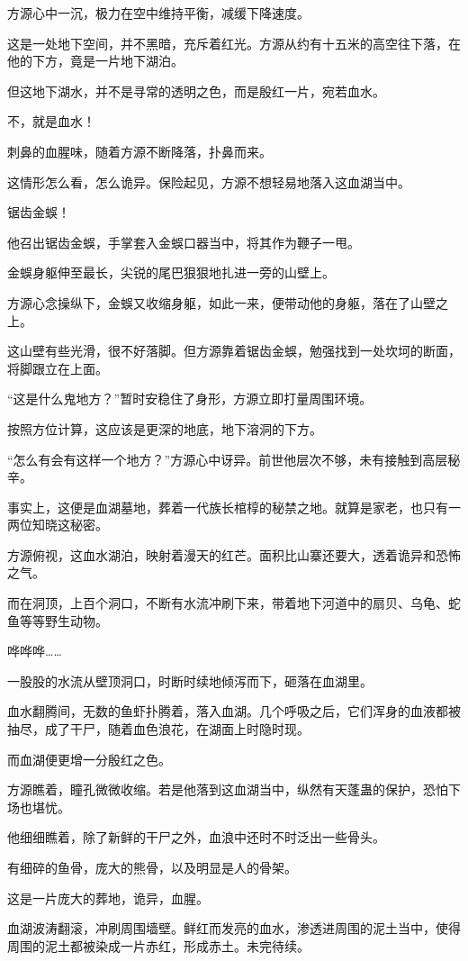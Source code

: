 \begin{this_body}
方源心中一沉，极力在空中维持平衡，减缓下降速度。

这是一处地下空间，并不黑暗，充斥着红光。方源从约有十五米的高空往下落，在他的下方，竟是一片地下湖泊。

但这地下湖水，并不是寻常的透明之色，而是殷红一片，宛若血水。

不，就是血水！

刺鼻的血腥味，随着方源不断降落，扑鼻而来。

这情形怎么看，怎么诡异。保险起见，方源不想轻易地落入这血湖当中。

锯齿金蜈！

他召出锯齿金蜈，手掌套入金蜈口器当中，将其作为鞭子一甩。

金蜈身躯伸至最长，尖锐的尾巴狠狠地扎进一旁的山壁上。

方源心念操纵下，金蜈又收缩身躯，如此一来，便带动他的身躯，落在了山壁之上。

这山壁有些光滑，很不好落脚。但方源靠着锯齿金蜈，勉强找到一处坎坷的断面，将脚跟立在上面。

“这是什么鬼地方？”暂时安稳住了身形，方源立即打量周围环境。

按照方位计算，这应该是更深的地底，地下溶洞的下方。

“怎么有会有这样一个地方？”方源心中讶异。前世他层次不够，未有接触到高层秘辛。

事实上，这便是血湖墓地，葬着一代族长棺椁的秘禁之地。就算是家老，也只有一两位知晓这秘密。

方源俯视，这血水湖泊，映射着漫天的红芒。面积比山寨还要大，透着诡异和恐怖之气。

而在洞顶，上百个洞口，不断有水流冲刷下来，带着地下河道中的扇贝、乌龟、蛇鱼等等野生动物。

哗哗哗……

一股股的水流从壁顶洞口，时断时续地倾泻而下，砸落在血湖里。

血水翻腾间，无数的鱼虾扑腾着，落入血湖。几个呼吸之后，它们浑身的血液都被抽尽，成了干尸，随着血色浪花，在湖面上时隐时现。

而血湖便更增一分殷红之色。

方源瞧着，瞳孔微微收缩。若是他落到这血湖当中，纵然有天蓬蛊的保护，恐怕下场也堪忧。

他细细瞧着，除了新鲜的干尸之外，血浪中还时不时泛出一些骨头。

有细碎的鱼骨，庞大的熊骨，以及明显是人的骨架。

这是一片庞大的葬地，诡异，血腥。

血湖波涛翻滚，冲刷周围墙壁。鲜红而发亮的血水，渗透进周围的泥土当中，使得周围的泥土都被染成一片赤红，形成赤土。未完待续。

\end{this_body}

